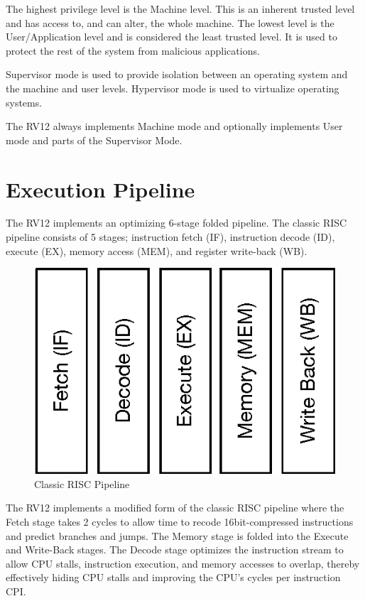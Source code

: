The highest privilege level is the Machine level.  This is an inherent trusted
level and has access to, and can alter, the whole machine.  The lowest level is
the User/Application level and is considered the least trusted level.  It is
used to protect the rest of the system from malicious applications.

Supervisor mode is used to provide isolation between an operating system and the
machine and user levels.  Hypervisor mode is used to virtualize operating
systems.

The RV12 always implements Machine mode and optionally implements User mode and
parts of the Supervisor Mode.

\section{Execution Pipeline}\label{execution-pipeline}

The RV12 implements an optimizing 6-stage folded pipeline.  The classic RISC
pipeline consists of 5 stages; instruction fetch (IF), instruction decode (ID),
execute (EX), memory access (MEM), and register write-back (WB).

\begin{figure}[hbt]
  \includegraphics{assets/img/Pipeline-Reg}
  \caption{Classic RISC Pipeline}
\end{figure}

The RV12 implements a modified form of the classic RISC pipeline where the Fetch
stage takes 2 cycles to allow time to recode 16bit-compressed instructions and
predict branches and jumps.  The Memory stage is folded into the Execute and
Write-Back stages.  The Decode stage optimizes the instruction stream to allow
CPU stalls, instruction execution, and memory accesses to overlap, thereby
effectively hiding CPU stalls and improving the CPU's cycles per instruction
CPI.

